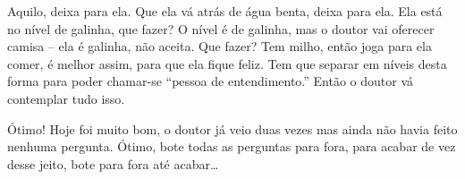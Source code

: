 Aquilo, deixa para ela. Que ela vá atrás de água benta, deixa para
ela. Ela está no nível de galinha, que fazer? O nível é de galinha, mas
o doutor vai oferecer camisa – ela é galinha, não aceita. Que fazer?
Tem milho, então joga para ela comer, é melhor assim, para que ela
fique feliz. Tem que separar em níveis desta forma para poder chamar-se
“pessoa de entendimento.” Então o doutor vá contemplar tudo isso.

Ótimo! Hoje foi muito bom, o doutor já veio duas vezes mas ainda não
havia feito nenhuma pergunta. Ótimo, bote todas as perguntas para fora,
para acabar de vez desse jeito, bote para fora até acabar…
